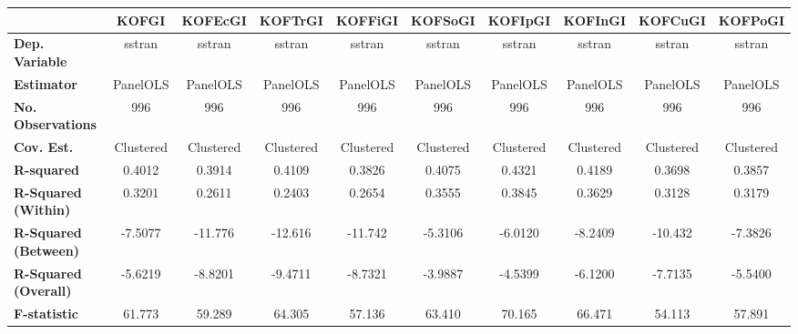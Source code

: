\begin{center}
\begin{tabular}{lccccccccc}
\toprule
                                   & \textbf{KOFGI} & \textbf{KOFEcGI} & \textbf{KOFTrGI} & \textbf{KOFFiGI} & \textbf{KOFSoGI} & \textbf{KOFIpGI} & \textbf{KOFInGI} & \textbf{KOFCuGI} & \textbf{KOFPoGI}  \\
\midrule
\textbf{Dep. Variable}             &     sstran     &      sstran      &      sstran      &      sstran      &      sstran      &      sstran      &      sstran      &      sstran      &      sstran       \\
\textbf{Estimator}                 &    PanelOLS    &     PanelOLS     &     PanelOLS     &     PanelOLS     &     PanelOLS     &     PanelOLS     &     PanelOLS     &     PanelOLS     &     PanelOLS      \\
\textbf{No. Observations}          &      996       &       996        &       996        &       996        &       996        &       996        &       996        &       996        &       996         \\
\textbf{Cov. Est.}                 &   Clustered    &    Clustered     &    Clustered     &    Clustered     &    Clustered     &    Clustered     &    Clustered     &    Clustered     &    Clustered      \\
\textbf{R-squared}                 &     0.4012     &      0.3914      &      0.4109      &      0.3826      &      0.4075      &      0.4321      &      0.4189      &      0.3698      &      0.3857       \\
\textbf{R-Squared (Within)}        &     0.3201     &      0.2611      &      0.2403      &      0.2654      &      0.3555      &      0.3845      &      0.3629      &      0.3128      &      0.3179       \\
\textbf{R-Squared (Between)}       &    -7.5077     &     -11.776      &     -12.616      &     -11.742      &     -5.3106      &     -6.0120      &     -8.2409      &     -10.432      &     -7.3826       \\
\textbf{R-Squared (Overall)}       &    -5.6219     &     -8.8201      &     -9.4711      &     -8.7321      &     -3.9887      &     -4.5399      &     -6.1200      &     -7.7135      &     -5.5400       \\
\textbf{F-statistic}               &     61.773     &      59.289      &      64.305      &      57.136      &      63.410      &      70.165      &      66.471      &      54.113      &      57.891       \\

\end{tabular}
\end{center}
